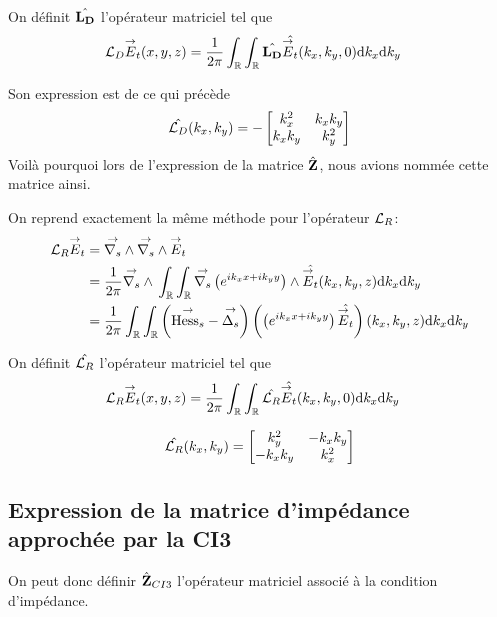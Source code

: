     On définit \(\hat{\mathbf{L_D}}\) l'opérateur matriciel tel que
    \begin{align}
      {\mathcal{L}_D} {\overset{\rightarrow}{E}}_t(x,y,z)
      &= \dfrac{1}{2\pi}\int_\mathbb R\int_\mathbb R \hat{\mathbf{L_D}} \hat{{\overset{\rightarrow}{E}}_t}(k_x,k_y,0)\mathrm{d}{k_x}\mathrm{d}{k_y}
    \end{align}

    Son expression est de ce qui précède
    \begin{equation}
      \label{eq:plan:fourier:LD}
      \hat{{\mathcal{L}_D}}(k_x,k_y) = -
      \begin{bmatrix}
        k_x^2 & k_x k_y
        \\
        k_x k_y & k_y^2
      \end{bmatrix}
    \end{equation}
    Voilà pourquoi lors de l'expression de la matrice \(\hat{\mathbf{Z}}\), nous avions nommée cette matrice ainsi.

    On reprend exactement la même méthode pour l'opérateur \({\mathcal{L}_R}\):
    \begin{align}
      {\mathcal{L}_R} {\overset{\rightarrow}{E}}_t & = {\overset{\rightarrow}{\nabla_s}} \wedge{} {\overset{\rightarrow}{\nabla_s}} \wedge{} {\overset{\rightarrow}{E}}_t
      \\
      &=\dfrac{1}{2\pi}{\overset{\rightarrow}{\nabla_s}} \wedge{} \int_\mathbb R\int_\mathbb R {\overset{\rightarrow}{\nabla_s}}{}\left(e^{ik_xx + ik_yy}\right) \wedge \hat{{\overset{\rightarrow}{E}}_t}(k_x,k_y,z)\mathrm{d}{k_x}\mathrm{d}{k_y}
      \\
      &= \dfrac{1}{2\pi}\int_\mathbb R \int_\mathbb R \left({\overset{\rightarrow}{\operatorname{Hess}_s}} - {\overset{\rightarrow}{\Delta_s}}\right) \left(\left(e^{ik_xx + ik_yy}\right) \hat{{\overset{\rightarrow}{E}}_t}\right)(k_x,k_y,z)\mathrm{d}{k_x}\mathrm{d}{k_y}
    \end{align}

    On définit \(\hat{{\mathcal{L}_R}}\) l'opérateur matriciel tel que
    \begin{align}
      {\mathcal{L}_R} {\overset{\rightarrow}{E}}_t(x,y,z)
      &= \dfrac{1}{2\pi}\int_\mathbb R\int_\mathbb R \hat{{\mathcal{L}_R}} \hat{{\overset{\rightarrow}{E}}_t}(k_x,k_y,0)\mathrm{d}{k_x}\mathrm{d}{k_y}
    \end{align}

    \begin{equation}
      \hat{{\mathcal{L}_R}}(k_x,k_y) =
      \begin{bmatrix}
        k_y^2 & -k_x k_y
        \\
        -k_x k_y & k_x^2
      \end{bmatrix}
    \end{equation}

  \subsection{Expression de la matrice d'impédance approchée par la CI3}

    On peut donc définir \(\hat{\mathbf{Z}}_{CI3}\) l’opérateur matriciel associé à la condition d'impédance.

